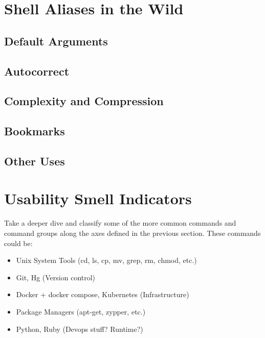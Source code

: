 \section{Shell Aliases in the Wild}



\subsection{Default Arguments}


\subsection{Autocorrect}


\subsection{Complexity and Compression}




\subsection{Bookmarks}

\subsection{Other Uses}


\section{Usability Smell Indicators}

Take a deeper dive and classify some of the more common commands and command groups along the axes defined in the previous section. These commands could be:
\begin{itemize}
	\item Unix System Tools (cd, ls, cp, mv, grep, rm, chmod, etc.)
	\item Git, Hg (Version control)
	\item Docker + docker compose, Kubernetes (Infrastructure)
	\item Package Managers (apt-get, zypper, etc.)
	\item Python, Ruby (Devops stuff? Runtime?)
\end{itemize}


